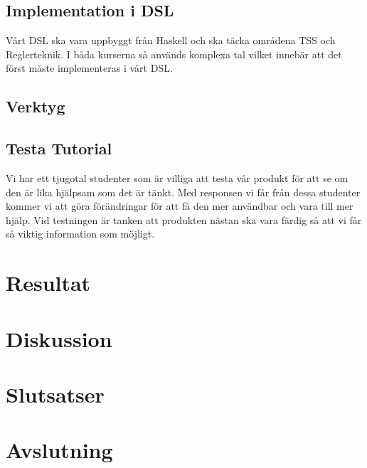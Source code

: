 \documentclass[]{article}
\begin{document}
\subsection{Implementation i DSL}

Vårt DSL ska vara uppbyggt från Haskell och ska täcka områdena TSS och Reglerteknik.
I båda kurserna så används komplexa tal vilket innebär att det först måste implementeras i vårt DSL.

\subsection{Verktyg}

\subsection{Testa Tutorial}

Vi har ett tjugotal studenter som är villiga att testa vår produkt för
att se om den är lika hjälpsam som det är tänkt. Med responsen vi får
från dessa studenter kommer vi att göra förändringar för att få den mer
användbar och vara till mer hjälp. Vid testningen är tanken att
produkten nästan ska vara färdig så att vi får så viktig information som
möjligt.

\section{Resultat}

%

\section{Diskussion}


\section{Slutsatser}

\section{Avslutning}

%

\newpage

\printbibliography
\end{document}
